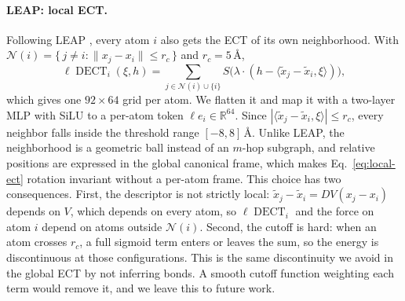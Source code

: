 \documentclass{article}
\newcommand{\R}{\mathbb{R}}
\newcommand{\DECT}{\operatorname{DECT}}
\begin{document}
\paragraph{LEAP: local ECT.}
Following LEAP \citep{garciaamboage2026leap}, every atom $i$ also gets the ECT of its own neighborhood. With $\mathcal N(i) = \{\, j\ne i : \|x_j - x_i\| \le r_c \,\}$ and $r_c = 5\,\text{\AA}$,
\begin{equation}
  \ell\DECT_i(\xi,h) = \sum_{j\in\mathcal N(i)\cup\{i\}} S\big(\lambda\cdot(h - \langle\tilde x_j - \tilde x_i, \xi\rangle)\big),
  \label{eq:local-ect}
\end{equation}
which gives one $92\times 64$ grid per atom. We flatten it and map it with a two-layer MLP with SiLU to a per-atom token $\ell e_i\in\R^{64}$. Since $|\langle\tilde x_j - \tilde x_i,\xi\rangle| \le r_c$, every neighbor falls inside the threshold range $[-8,8]\,$\AA. Unlike LEAP, the neighborhood is a geometric ball instead of an $m$-hop subgraph, and relative positions are expressed in the global canonical frame, which makes Eq.~\eqref{eq:local-ect} rotation invariant without a per-atom frame. This choice has two consequences. First, the descriptor is not strictly local: $\tilde x_j - \tilde x_i = DV(x_j - x_i)$ depends on $V$, which depends on every atom, so $\ell\DECT_i$ and the force on atom $i$ depend on atoms outside $\mathcal N(i)$. Second, the cutoff is hard: when an atom crosses $r_c$, a full sigmoid term enters or leaves the sum, so the energy is discontinuous at those configurations. This is the same discontinuity we avoid in the global ECT by not inferring bonds. A smooth cutoff function weighting each term would remove it, and we leave this to future work.
\end{document}
